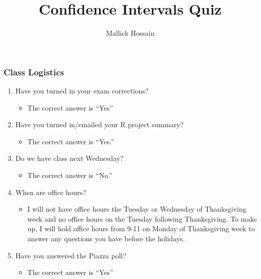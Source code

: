 \documentclass{beamer}
\title{Confidence Intervals Quiz}
\author{Mallick Hossain}
\date{}
\institute{University of Pennsylvania}
\begin{document}
\begin{frame}
	\titlepage 
\end{frame} 

\begin{frame}
\frametitle{Class Logistics}
    \begin{enumerate}[<+- | alert@+>]
        \item Have you turned in your exam corrections?
        \begin{itemize}
	        	\item The correct answer is ``Yes''
        \end{itemize}
        \item Have you turned in/emailed your R project summary?
   			\begin{itemize}
        		\item The correct answer is ``Yes.''
        \end{itemize}
        \item Do we have class next Wednesday?
        \begin{itemize}
        	\item The correct answer is ``No.''
        \end{itemize}
        \item When are office hours?
        \begin{itemize}
        	\item I will not have office hours the Tuesday or Wednesday of Thanksgiving week and no office hours on the Tuesday following Thanksgiving. To make up, I will hold office hours from 9-11 on Monday of Thanksgiving week to answer any questions you have before the holidays.
        \end{itemize}
        \item Have you answered the Piazza poll?
        \begin{itemize}
        	\item The correct answer is ``Yes''
        \end{itemize}
    \end{enumerate}
\end{frame} 
\end{document}
